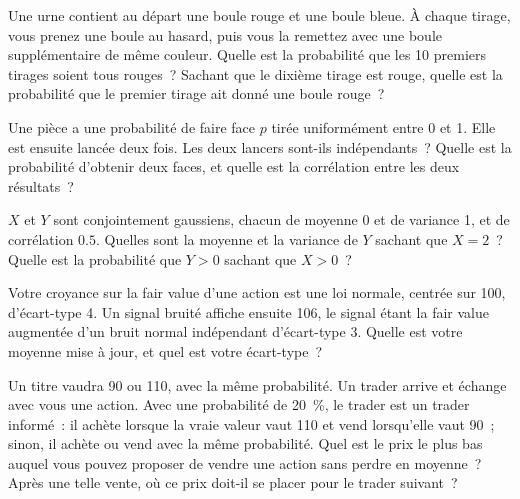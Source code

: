 \begin{question}\label{iq:iv1:conditional-probability-and-bayes:22}
Une urne contient au départ une boule rouge et une boule bleue. À chaque tirage, vous prenez une boule au hasard, puis vous la remettez avec une boule supplémentaire de même couleur. Quelle est la probabilité que les 10 premiers tirages soient tous rouges~? Sachant que le dixième tirage est rouge, quelle est la probabilité que le premier tirage ait donné une boule rouge~?
\end{question}

\begin{question}\label{iq:iv1:conditional-probability-and-bayes:23}
Une pièce a une probabilité de faire face $p$ tirée uniformément entre 0 et 1. Elle est ensuite lancée deux fois. Les deux lancers sont-ils indépendants~? Quelle est la probabilité d'obtenir deux faces, et quelle est la corrélation entre les deux résultats~?
\end{question}

\begin{question}\label{iq:iv1:conditional-probability-and-bayes:24}
$X$ et $Y$ sont conjointement gaussiens, chacun de moyenne 0 et de variance 1, et de corrélation $0.5$. Quelles sont la moyenne et la variance de $Y$ sachant que $X = 2$~? Quelle est la probabilité que $Y > 0$ sachant que $X > 0$~?
\end{question}

\begin{question}\label{iq:iv1:conditional-probability-and-bayes:25}
Votre croyance sur la fair value d'une action est une loi normale, centrée sur 100, d'écart-type 4. Un signal bruité affiche ensuite 106, le signal étant la fair value augmentée d'un bruit normal indépendant d'écart-type 3. Quelle est votre moyenne mise à jour, et quel est votre écart-type~?
\end{question}

\begin{question}\label{iq:iv1:conditional-probability-and-bayes:26}
Un titre vaudra 90 ou 110, avec la même probabilité. Un trader arrive et échange avec vous une action. Avec une probabilité de 20~\%, le trader est un trader informé~: il achète lorsque la vraie valeur vaut 110 et vend lorsqu'elle vaut 90~; sinon, il achète ou vend avec la même probabilité. Quel est le prix le plus bas auquel vous pouvez proposer de vendre une action sans perdre en moyenne~? Après une telle vente, où ce prix doit-il se placer pour le trader suivant~?
\end{question}

